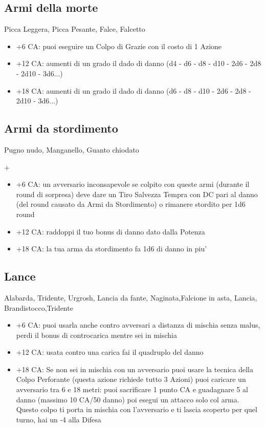 \documentclass[a4paper,11pt,twoside,openany]{book}
\begin{document}
\subsection{Armi della morte} Picca Leggera, Picca Pesante, Falce, Falcetto

\begin{itemize}
	\item +6 CA: puoi eseguire un Colpo di Grazie con il costo di 1 Azione

	\item +12 CA: aumenti di un grado il dado di danno (d4 - d6 - d8 - d10 - 2d6 - 2d8 - 2d10 - 3d6...)

	\item +18 CA: aumenti di un grado il dado di danno (d6 - d8 - d10 - 2d6 - 2d8 - 2d10 - 3d6...)

\end{itemize}

\subsection{Armi da stordimento} Pugno nudo, Manganello, Guanto chiodato

+\begin{itemize}
	\item +6 CA: un avversario inconsapevole se colpito con queste armi (durante il round di sorpresa) deve dare un Tiro Salvezza Tempra con DC pari al danno (del round causato da Armi da Stordimento) o rimanere stordito per 1d6 round

	\item +12 CA: raddoppi il tuo bonus di danno dato dalla Potenza

	\item +18 CA: la tua arma da stordimento fa 1d6 di danno in piu'
\end{itemize}

\subsection{Lance} Alabarda, Tridente, Urgrosh, Lancia da fante, Naginata,Falcione in asta, Lancia, Brandistocco,Tridente

\begin{itemize}
	\item +6 CA: puoi usarla anche contro avversari a distanza di mischia senza malus, perdi il bonus di controcarica mentre sei in mischia

	\item +12 CA: usata contro una carica fai il quadruplo del danno

	\item +18 CA: Se non sei in mischia con un avversario puoi usare la tecnica della Colpo Perforante (questa azione richiede tutto 3 Azioni) puoi caricare un avversario tra 6 e 18 metri: puoi sacrificare 1 punto CA e guadagnare 5 al danno (massimo 10 CA/50 danno) poi esegui un attacco solo col arma. Questo colpo ti porta in mischia con l'avversario e ti lascia scoperto per quel turno, hai un -4 alla Difesa

\end{itemize}
\end{document}
